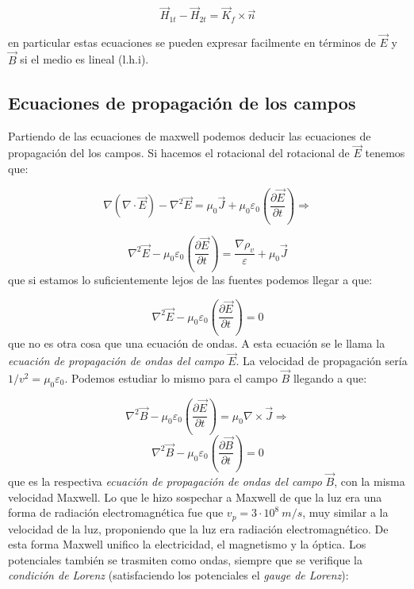 \documentclass[12pt]{article}
\newcommand{\parentesis}[1]{\left( #1  \right)}
\newcommand{\parciales}[2]{\frac{\partial #1}{\partial #2}}
\newcommand{\pparciales}[2]{\parentesis{\parciales{#1}{#2}}}
\begin{document}
\begin{equation}
\vec{H}_{1t} - \vec{H}_{2t} = \vec{K}_f \times \vec{n}
\end{equation}

en particular estas ecuaciones se pueden expresar facilmente en términos de $\vec{E} $ y $\vec{B}$ si el medio es lineal (l.h.i).


\subsection{Ecuaciones de propagación de los campos}

Partiendo de las ecuaciones de maxwell podemos deducir las ecuaciones de propagación del los campos. Si hacemos el rotacional del rotacional de $\vec{E}$ tenemos que:

$$
\nabla (\nabla \cdot \vec{E}) -  \nabla^2 \vec{E} = \mu_0 \vec{J} + \mu_0 \varepsilon_0 \pparciales{\vec{E}}{t} \Longrightarrow
$$

\begin{equation}
\nabla^2 \vec{E} -  \mu_0 \varepsilon_0 \pparciales{\vec{E}}{t}  = \dfrac{\nabla \rho_v}{\varepsilon} + \mu_0 \vec{J}
\end{equation}
que si estamos lo suficientemente lejos de las fuentes podemos llegar a que:

\begin{equation}
\nabla^2 \vec{E} -  \mu_0 \varepsilon_0 \pparciales{\vec{E}}{t}  = 0
\end{equation}
que no es otra cosa que una ecuación de ondas. A esta ecuación se le llama la \textit{ecuación de propagación de ondas del campo} $\vec{E}$. La velocidad de propagación sería $1/v^2 = \mu_0 \varepsilon_0$. Podemos estudiar lo mismo para el campo $\vec{B}$ llegando a que:


\begin{equation}
\nabla^2 \vec{B} -  \mu_0 \varepsilon_0 \pparciales{\vec{E}}{t}  = \mu_0 \nabla \times \vec{J} \Longrightarrow
\end{equation}
\begin{equation}
\nabla^2 \vec{B} -  \mu_0 \varepsilon_0 \pparciales{\vec{B}}{t}  = 0
\end{equation}
que es la respectiva \textit{ecuación de propagación de ondas del campo} $\vec{B}$, con la misma velocidad Maxwell. Lo que le hizo sospechar a Maxwell de que la luz era una forma de radiación electromagnética fue que $v_p = 3 \cdot10^8 \ m/s$, muy similar a la velocidad de la luz, proponiendo que la luz era radiación electromagnético. De esta forma Maxwell unifico la electricidad, el magnetismo y la óptica. Los potenciales también se trasmiten como ondas, siempre que se verifique la \textit{condición de Lorenz} (satisfaciendo los potenciales el \textit{gauge de Lorenz}):
\end{document}
